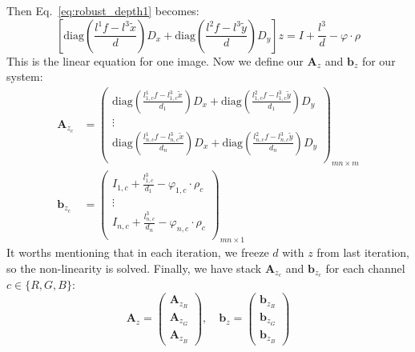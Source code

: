 Then Eq.~\ref{eq:robust_depth1} becomes:
\begin{equation}\label{eq:robust_depth2}
        [\text{diag}(\frac{l^1f - l^3\tilde{x}}{d}) D_x + \text{diag}(\frac{l^2f - l^3\tilde{y}}{d}) D_y] z = I + \frac{l^3}{d} - \varphi \cdot \rho
\end{equation}
This is the linear equation for one image. 
Now we define our $\mathbf{A}_z$ and $\mathbf{b}_z$ for our system:
\begin{equation}\label{eq:robust_depth3}
\begin{split}
    \mathbf{A}_{z_c} &= 
        \begin{pmatrix}    
            \text{diag}(\frac{l^1_{1,c}f - l^3_{1,c}\tilde{x}}{d_1}) D_x + \text{diag}(\frac{l^2_{1,c}f - l^3_{1,c}\tilde{y}}{d_1}) D_y \\
            \vdots \\
            \text{diag}(\frac{l^1_{n,c}f - l^3_{n,c}\tilde{x}}{d_n}) D_x + \text{diag}(\frac{l^2_{n,c}f - l^3_{n,c}\tilde{y}}{d_n}) D_y \\
        \end{pmatrix}_{mn \times m}
\\
    \mathbf{b}_{z_c} &=     
        \begin{pmatrix}    
            I_{1,c} + \frac{l^3_{1,c}}{d_{1}} - \varphi_{1,c} \cdot \rho_{c} \\
            \vdots\\
            I_{n,c} + \frac{l^3_{n,c}}{d_{n}} - \varphi_{n,c} \cdot \rho_{c} \\
        \end{pmatrix}_{mn \times 1}    
\end{split}
\end{equation}
 It worths mentioning that in each iteration, we freeze $d$ with $z$ from last iteration, so the non-linearity is solved.
 Finally, we have stack $\mathbf{A}_{z_c}$ and $\mathbf{b}_{z_c}$ for each channel $c\in\{R,G,B\}$:
 \begin{equation}
     \mathbf{A}_z = 
         \begin{pmatrix}
             \mathbf{A}_{z_R}\\
             \mathbf{A}_{z_G}\\
             \mathbf{A}_{z_B}
         \end{pmatrix},\quad
     \mathbf{b}_z = 
         \begin{pmatrix}
             \mathbf{b}_{z_R}\\
             \mathbf{b}_{z_G}\\
             \mathbf{b}_{z_B}
         \end{pmatrix}         
 \end{equation}
